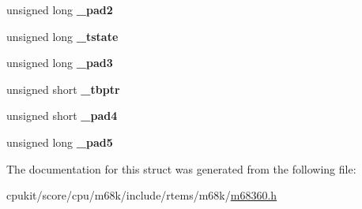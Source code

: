 \begin{DoxyCompactItemize}
\mbox{\label{structm360SPIparms___a84b0c6a224f0f2dda1d8f4d11ac4b812}} 
unsigned long {\bfseries \+\_\+pad2}
\item 
\mbox{\label{structm360SPIparms___a17163fba26915b32c8effb41ad7c4fdc}} 
unsigned long {\bfseries \+\_\+tstate}
\item 
\mbox{\label{structm360SPIparms___a815f608d7f0536414d3b0099771a7548}} 
unsigned long {\bfseries \+\_\+pad3}
\item 
\mbox{\label{structm360SPIparms___af6faedf9758364f06c9865081ca1a0b4}} 
unsigned short {\bfseries \+\_\+tbptr}
\item 
\mbox{\label{structm360SPIparms___abfbb3d5e30e57bafc6ce2b67d6ebb374}} 
unsigned short {\bfseries \+\_\+pad4}
\item 
\mbox{\label{structm360SPIparms___a71bc5e8f3481f035ae19c337893788f4}} 
unsigned long {\bfseries \+\_\+pad5}
\end{DoxyCompactItemize}


The documentation for this struct was generated from the following file\+:\begin{DoxyCompactItemize}
\item 
cpukit/score/cpu/m68k/include/rtems/m68k/\mbox{\hyperlink{m68360_8h}{m68360.\+h}}\end{DoxyCompactItemize}
